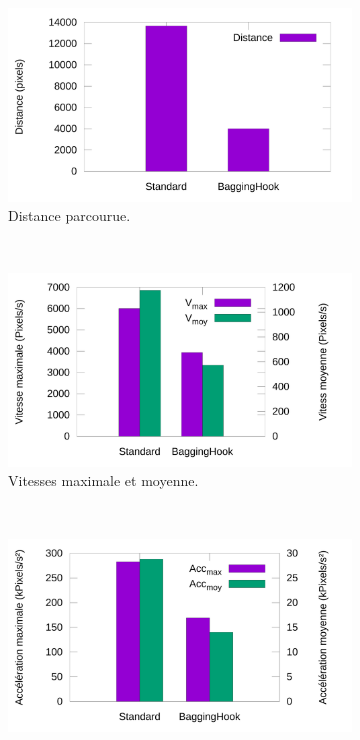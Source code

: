 	\begin{figure}[htb]
		\begin{subfigure}[t]{0.49\textwidth}
			\centering
			\includegraphics[width=\textwidth]{figures/ch5/distHisto}
			\caption{Distance parcourue.}
			\label{fig:distHisto}
		\end{subfigure}
		~
		\begin{subfigure}[t]{0.49\textwidth}
			\centering
			\includegraphics[width=\textwidth]{figures/ch5/speedHisto}
			\caption{Vitesses maximale et moyenne.}
			\label{fig:speedHisto}
		\end{subfigure}
		~
		\begin{subfigure}[t]{0.49\textwidth}
			\centering
			\includegraphics[width=\textwidth]{figures/ch5/accelHisto}

\end{subfigure}
\end{figure}
